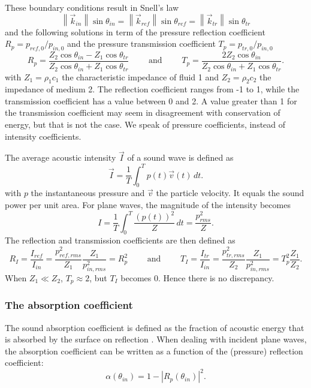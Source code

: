 These boundary conditions result in Snell's law
\[
\left\|\vec{k}_{in}\right\| \sin\theta_{in} = \left\|\vec{k}_{ref}\right\| \sin\theta_{ref} = \left\|\vec{k}_{tr}\right\| \sin\theta_{tr}
\]
and the following solutions in term of the pressure reflection coefficient $R_p = p_{ref,0}/p_{in,0}$ and the pressure transmission coefficient $T_p = p_{tr,0}/p_{in,0}$ 
\[
R_p = \frac{Z_2 \cos \theta_{in} - Z_1 \cos \theta_{tr}}{Z_2 \cos \theta_{in} + Z_1 \cos \theta_{tr}} \qquad \textrm{ and } \qquad
T_p = \frac{2 Z_2 \cos \theta_{in} }{Z_2 \cos \theta_{in} + Z_1 \cos \theta_{tr}}.
\]
with $Z_1 = \rho_1 c_1$ the characteristic impedance of fluid 1 and $Z_2 = \rho_2 c_2$ the impedance of medium 2.  
The reflection coefficient ranges from -1 to 1, while the transmission coefficient has a value between 0 and 2. A value greater than 1 for the transmission coefficient may seem in disagreement with conservation of energy, but that is not the case. We speak of pressure coefficients, instead of intensity coefficients. 

The average acoustic intensity $\vec{I}$ of a sound wave is defined as 
\[
\vec{I} = \frac{1}{T} \int^{T}_{0}{p(t) \vec{v}(t) \,dt}.
\]
with $p$ the instantaneous pressure and $\vec{v}$ the particle velocity. It equals the sound power per unit area. For plane waves, the magnitude of the intensity becomes 
\[
I = \frac{1}{T} \int^{T}_{0}{\frac{\left(p(t)\right)^2}{Z} \,dt} = \frac{p^2_{rms}}{Z}.
\]
The reflection and transmission coefficients are then defined as
\[
R_I = \frac{I_{ref}}{I_{in}} = \frac{p^2_{ref,rms}}{Z_1} \frac{Z_1}{p^2_{in,rms}} = R_p^2 \qquad\textrm{ and } \qquad T_I = \frac{I_{tr}}{I_{in}} = \frac{p^2_{tr,rms}}{Z_2} \frac{Z_1}{p^2_{in,rms}} = T_p^2 \frac{Z_1}{Z_2}. 
\]
When $Z_1 \ll Z_2$, $T_p \approx 2$, but $T_I$ becomes 0. Hence there is no discrepancy.




\subsubsection*{The absorption coefficient}
The sound absorption coefficient is defined as the fraction of acoustic energy that is absorbed by the surface on reflection \cite[p.12]{Geetere}.  When dealing with incident plane waves, the absorption coefficient can be written as a function of the (pressure) reflection coefficient:
\begin{equation}
\alpha(\theta_{in}) = 1 - \left|R_p(\theta_{in})\right|^2.
\label{absorption}
\end{equation}











\begin{comment}

\end{comment}
